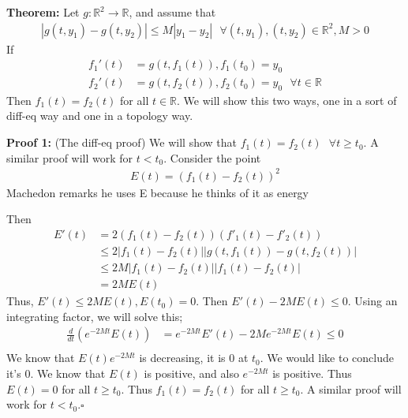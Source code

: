 \documentclass{article}
\newcommand*{\qed}{\hfill$\square$}%
\newcommand*{\txt}[1]{\text{ #1 }}%
\newcommand*{\fora}{\txt{}\forall}%
\newcommand*{\rr}{\mathbb{R}}%
\begin{document}
\textbf{Theorem:} Let $g:\rr^2\to\rr$, and assume that \begin{align*}
    |g(t,y_1)-g(t,y_2)|\leq M|y_1-y_2|\fora (t,y_1),(t,y_2)\in \rr^2,M>0
\end{align*} If \begin{align*}
    f_1'(t)&=g(t,f_1(t)),f_1(t_0)=y_0\\
    f_2'(t)&=g(t,f_2(t)),f_2(t_0)=y_0 \fora t\in \rr
\end{align*} Then $f_1(t)=f_2(t)$ for all $t\in \rr$. We will show this two ways, one in a sort of diff-eq way and one in a topology way.

\textbf{Proof 1:} (The diff-eq proof) We will show that $f_1(t)=f_2(t)\fora t\geq t_0$. A similar proof will work for $t<t_0$. Consider the point \begin{align*}
    E(t)=(f_1(t)-f_2(t))^2
\end{align*} Machedon remarks he uses E because he thinks of it as energy

Then \begin{align*}
    E'(t)&=2(f_1(t)-f_2(t))(f'_1(t)-f'_2(t))\\ 
    &\leq 2|f_1(t)-f_2(t)||g(t,f_1(t))-g(t,f_2(t))|\\
    &\leq 2M|f_1(t)-f_2(t)||f_1(t)-f_2(t)|\\
    &=2ME(t)
\end{align*} Thus, $E'(t)\leq 2ME(t),E(t_0)=0$. Then $E'(t)-2ME(t)\leq 0$. Using an integrating factor, we will solve this; \begin{align*}
    \frac{d}{dt}(e^{-2Mt}E(t))&=e^{-2Mt}E'(t)-2Me^{-2Mt}E(t)\leq 0\\
\end{align*} We know that $E(t)e^{-2Mt}$ is decreasing, it is $0$ at $t_0$. We would like to conclude it's $0$. We know that $E(t)$ is positive, and also $e^{-2Mt}$ is positive. Thus $E(t)=0$ for all $t\geq t_0$. Thus $f_1(t)=f_2(t)$ for all $t\geq t_0$. A similar proof will work for $t<t_0$.\qed 
\end{document}

